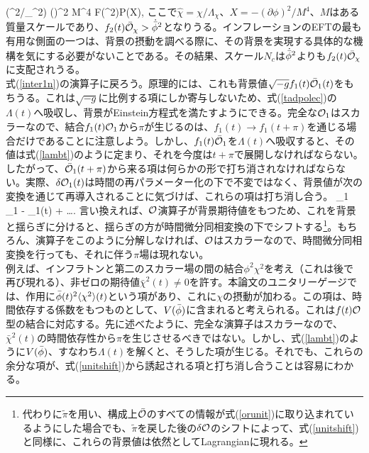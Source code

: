 \beq 
(\chi^2/\Lambda_\chi^2) (\partial\phi)^2 \to M^4 F({\hat\chi}^2)P(X),
\eeq
ここで$\hat\chi = \chi/\Lambda_\chi$、$X=-(\partial\phi)^2/M^4$、$M$はある質量スケールであり、$f_2(t)\bar{{\cal O}}_\chi > \dot{{\bar\phi}}^2$となりうる。インフレーションのEFTの最も有用な側面の一つは、背景の摂動を調べる際に、その背景を実現する具体的な機構を気にする必要がないことである。その結果、スケール$N_c$は$\dot{{\bar\phi}}^2$よりも$f_2(t)\bar{{\cal O}}_\chi$に支配されうる。\\

式(\ref{inter1n})の演算子に戻ろう。原理的には、これも背景値$\sqrt{-g} f_1(t)\bar{{\cal O}}_1(t)$をもちうる。これは$\sqrt{-g}$に比例する項にしか寄与しないため、式(\ref{tadpolec})の$\Lambda(t)$へ吸収し、背景がEinstein方程式を満たすようにできる。完全な${\cal O}_1$はスカラーなので、結合$f_1(t){\cal O}_1$から$\pi$が生じるのは、$f_1(t) \to f_1(t+\pi)$を通じる場合だけであることに注意しよう。しかし、$f_1(t)\bar{{\cal O}}_1$を$\Lambda(t)$へ吸収すると、その値は式(\ref{lambt})のように定まり、それを今度は$t+\pi$で展開しなければならない。したがって、$\bar{{\cal O}}_1(t+\pi)$から来る項は何らかの形で打ち消されなければならない。実際、$\delta {\cal O}_1(t)$は時間の再パラメーター化の下で不変ではなく、背景値が次の変換を通じて再導入されることに気づけば、これらの項は打ち消し合う。
\beq
\label{unitshift}
\delta \calo_1 \to \delta \calo_1 - \dot{\bar\calo}_1(t) \pi + \ldots.
\eeq
言い換えれば、${\cal O}$演算子が背景期待値をもつため、これを背景と揺らぎに分けると、揺らぎの方が時間微分同相変換の下でシフトする\footnote{代わりに$\tilde\pi$を用い、構成上$\bar{{\cal O}}$のすべての情報が式(\ref{orunit})に取り込まれているようにした場合でも、$\tilde\pi$を戻した後の$\delta{\cal O}$のシフトによって、式(\ref{unitshift})と同様に、これらの背景値は依然としてLagrangianに現れる。}。もちろん、演算子をこのように分解しなければ、${\cal O}$はスカラーなので、時間微分同相変換を行っても、それに伴う$\pi$場は現れない。\\

例えば、インフラトンと第二のスカラー場の間の結合$\phi^2\chi^2$を考え（これは後で再び現れる）、非ゼロの期待値$\bar\chi^2(t) \neq 0$を許す。本論文のユニタリーゲージでは、作用に${\bar\phi}(t)^2 \langle\chi^2\rangle (t)$という項があり、これに$\chi$の摂動が加わる。この項は、時間依存する係数をもつものとして、$V({\bar\phi})$に含まれると考えられる。これは$f(t){\cal O}$型の結合に対応する。先に述べたように、完全な演算子はスカラーなので、$\bar\chi^2(t)$の時間依存性から$\pi$を生じさせるべきではない。しかし、式(\ref{lambt})のように$V({\bar\phi})$、すなわち$\Lambda(t)$を解くと、そうした項が生じる。それでも、これらの余分な項が、式(\ref{unitshift})から誘起される項と打ち消し合うことは容易にわかる。\\

